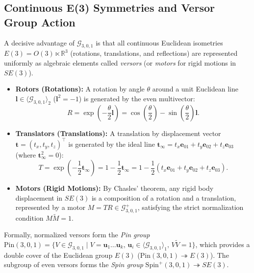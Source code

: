 \documentclass[10pt]{article}
\begin{document}
\subsection{Continuous E(3) Symmetries and Versor Group Action}
\label{subsec:pga_versors}

A decisive advantage of $\mathcal{G}_{3,0,1}$ is that all continuous Euclidean isometries $E(3) = O(3) \ltimes \mathbb{R}^3$ (rotations, translations, and reflections) are represented uniformly as algebraic elements called \emph{versors} (or \emph{motors} for rigid motions in $SE(3)$).
\begin{itemize}
    \item \textbf{Rotors (Rotations):} A rotation by angle $\theta$ around a unit Euclidean line $\mathbf{l} \in \langle \mathcal{G}_{3,0,1} \rangle_2$ ($\mathbf{l}^2 = -1$) is generated by the even multivector:
    \begin{equation}
        R = \exp\left(-\frac{\theta}{2} \mathbf{l}\right) = \cos\left(\frac{\theta}{2}\right) - \sin\left(\frac{\theta}{2}\right) \mathbf{l}.
    \end{equation}

    \item \textbf{Translators (Translations):} A translation by displacement vector $\mathbf{t} = (t_x, t_y, t_z)^\top$ is generated by the ideal line $\mathbf{t}_\infty = t_x \mathbf{e}_{01} + t_y \mathbf{e}_{02} + t_z \mathbf{e}_{03}$ (where $\mathbf{t}_\infty^2 = 0$):
    \begin{equation}
        T = \exp\left(-\frac{1}{2} \mathbf{t}_\infty\right) = 1 - \frac{1}{2}\mathbf{t}_\infty = 1 - \frac{1}{2} (t_x \mathbf{e}_{01} + t_y \mathbf{e}_{02} + t_z \mathbf{e}_{03}).
    \end{equation}

    \item \textbf{Motors (Rigid Motions):} By Chasles' theorem, any rigid body displacement in $SE(3)$ is a composition of a rotation and a translation, represented by a motor $M = TR \in \mathcal{G}_{3,0,1}^+$, satisfying the strict normalization condition $M \widetilde{M} = 1$.
\end{itemize}

Formally, normalized versors form the \emph{Pin group} $\mathrm{Pin}(3,0,1) = \{V \in \mathcal{G}_{3,0,1} \mid V = \mathbf{u}_1 \dots \mathbf{u}_k, \, \mathbf{u}_i \in \langle \mathcal{G}_{3,0,1} \rangle_1, \, V\widetilde{V}=1\}$, which provides a double cover of the Euclidean group $E(3)$ ($\mathrm{Pin}(3,0,1) \twoheadrightarrow E(3)$). The subgroup of even versors forms the \emph{Spin group} $\mathrm{Spin}^+(3,0,1) \twoheadrightarrow SE(3)$.
\end{document}
